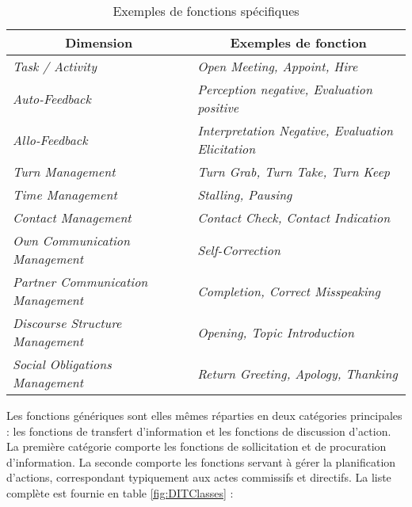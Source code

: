 \documentclass[10pt,a4paper,twoside]{article}
\begin{document}
\begin{table}[h]
	\centering
	\begin{tabular}{ll}
		\toprule
		\multicolumn{1}{c}{Dimension} & \multicolumn{1}{c}{Exemples de fonction} \\
		\midrule
		\textit{Task / Activity} & \textit{Open Meeting, Appoint, Hire } \\
		\textit{Auto-Feedback} & \textit{Perception negative, Evaluation positive} \\
		\textit{Allo-Feedback} & \textit{Interpretation Negative, Evaluation Elicitation} \\
		\textit{Turn Management} & \textit{Turn Grab, Turn Take, Turn Keep} \\
		\textit{Time Management} & \textit{Stalling, Pausing} \\
		\textit{Contact Management} & \textit{Contact Check, Contact Indication} \\
		\textit{Own Communication Management} & \textit{Self-Correction} \\
		\textit{Partner Communication Management} & \textit{Completion, Correct Misspeaking} \\
		\textit{Discourse Structure Management} & \textit{Opening, Topic Introduction} \\
		\textit{Social Obligations Management} & \textit{Return Greeting, Apology, Thanking} \\
		\bottomrule
	\end{tabular}
	\caption{Exemples de fonctions spécifiques}
	\label{fig:dimensionSpecificFunctions}
\end{table}

Les fonctions génériques sont elles mêmes réparties en deux catégories principales : les fonctions de transfert d'information et les fonctions de discussion d'action. La première catégorie comporte les fonctions de sollicitation et de procuration d'information. La seconde comporte les fonctions servant à gérer la planification d'actions, correspondant typiquement aux actes commissifs et directifs. La liste complète est fournie en table \ref{fig:DITClasses} :
\end{document}
